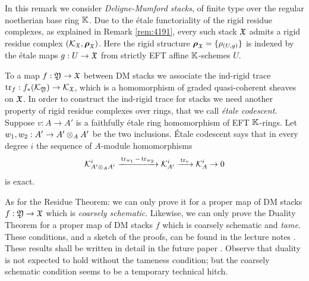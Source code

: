\begin{rem} \label{rem:4193}
In this remark we consider {\em Deligne-Mumford stacks}, of finite type 
over the regular noetherian base ring $\mathbb{K}$. Due to the \'etale functoriality of 
the rigid residue complexes, as explained in Remark \ref{rem:4191}, every such 
stack $\mathfrak{X}$ admits a rigid residue complex 
$(\mathcal{K}_{\mathfrak{X}}, \boldsymbol{\rho}_{\mathfrak{X}})$.
Here the rigid structure 
$\boldsymbol{\rho}_{\mathfrak{X}} = \{ \rho_{(U, g)} \}$
is indexed by the \'etale maps $g : U \to \mathfrak{X}$ from strictly EFT affine 
$\mathbb{K}$-schemes $U$. 

To a map $f : \mathfrak{Y} \to \mathfrak{X}$ between DM stacks 
we associate the ind-rigid trace 
$\operatorname{tr}_{f} : f_{*}(\mathcal{K}_{\mathfrak{Y}}) \to \mathcal{K}_{\mathfrak{X}}$,
which is a homomorphism of graded quasi-coherent sheaves on $\mathfrak{X}$. 
In order to construct the ind-rigid trace for stacks we need another property 
of rigid residue complexes over rings, that we call {\em \'etale codescent}. 
Suppose $v : A \to A'$ is a faithfully \'etale ring homomorphism of EFT 
$\mathbb{K}$-rings. Let $w_1, w_2 : A' \to A' \otimes_{A} A'$ be the two inclusions. 
\'Etale codescent says that in every degree $i$ the sequence of $A$-module 
homomorphisms 
\[ \mathcal{K}^i_{A' \otimes_{A} A'} \xrightarrow{ \, \operatorname{tr}_{w_1} - \operatorname{tr}_{w_2} \, }
\mathcal{K}^i_{A'} \xrightarrow{ \, \operatorname{tr}_{v} \, } \mathcal{K}^i_A \to 0 \]
is exact. 

As for the Residue Theorem: we can only prove it for a proper map of DM stacks 
$f : \mathfrak{Y} \to \mathfrak{X}$ which is {\em coarsely schematic}.
Likewise, we can only prove the Duality Theorem for a proper map of DM stacks 
$f$ which is coarsely schematic and {\em tame}. These conditions, and a sketch 
of the proofs, can be found in the lecture notes \cite{Ye10}. 
These results shall be written in detail in the future paper \cite{Ye13}. 
Observe that duality is not expected to hold without the tameness condition; 
but the coarsely schematic condition seems to be a temporary technical hitch. 
\end{rem}
  








